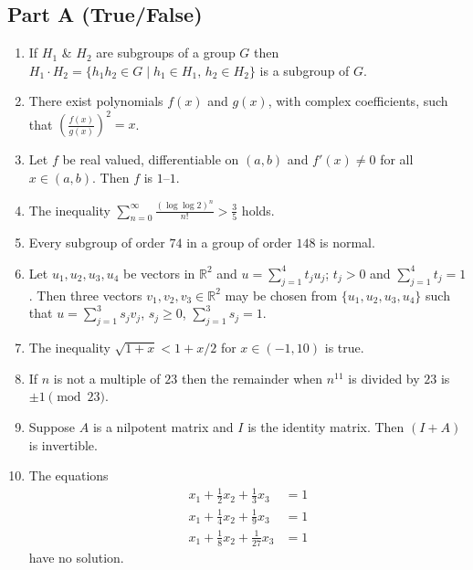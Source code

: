 \documentclass[11pt, a4paper]{article}
\begin{document}
\subsection*{Part A (True/False)}
\begin{enumerate}
  \item If $H_1$ \& $H_2$ are subgroups of a group $G$ then $H_1 \cdot H_2 = \{h_1 h_2 \in G \mid h_1 \in H_1, \, h_2 \in H_2\}$ is a subgroup of $G$.
  \item There exist polynomials $f(x)$ and $g(x)$, with complex coefficients, such that $\left(\frac{f(x)}{g(x)}\right)^2 = x$.
  \item Let $f$ be real valued, differentiable on $(a, b)$ and $f'(x) \ne 0$ for all $x \in (a, b)$. Then $f$ is $1$--$1$.
  \item The inequality $\displaystyle \sum_{n=0}^\infty \frac{(\log \log 2)^n}{n!} > \frac{3}{5}$ holds.
  \item Every subgroup of order $74$ in a group of order $148$ is normal.
  \item Let $u_1, u_2, u_3, u_4$ be vectors in $\mathbb{R}^2$ and $u = \sum_{j=1}^4 t_j u_j$; $t_j > 0$ and $\sum_{j=1}^4 t_j = 1$. Then three vectors $v_1, v_2, v_3 \in \mathbb{R}^2$ may be chosen from $\{u_1, u_2, u_3, u_4\}$ such that $u = \sum_{j=1}^3 s_j v_j$, $s_j \ge 0$, $\sum_{j=1}^3 s_j = 1$.
  \item The inequality $\sqrt{1 + x} < 1 + x/2$ for $x \in (-1, 10)$ is true.
  \item If $n$ is not a multiple of $23$ then the remainder when $n^{11}$ is divided by $23$ is $\pm 1 \pmod{23}$.
  \item Suppose $A$ is a nilpotent matrix and $I$ is the identity matrix. Then $(I + A)$ is invertible.
  \item The equations
  \begin{align*}
    x_1 + \frac{1}{2} x_2 + \frac{1}{3} x_3 &= 1 \\
    x_1 + \frac{1}{4} x_2 + \frac{1}{9} x_3 &= 1 \\
    x_1 + \frac{1}{8} x_2 + \frac{1}{27} x_3 &= 1
  \end{align*}
  have no solution.
\end{enumerate}
\end{document}
